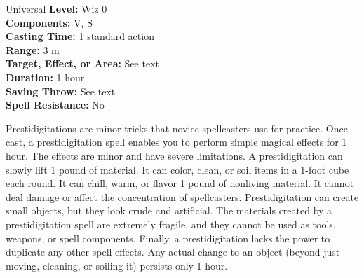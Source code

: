 {Universal}
{
	\textbf{Level:}
	Wiz 0\\
	\textbf{Components:}
	V, S\\
	\textbf{Casting Time:}
	1 standard action\\
	\textbf{Range:}
	3 m\\
	\textbf{Target, Effect, or Area:}
	See text\\
	\textbf{Duration:}
	1 hour\\
	\textbf{Saving Throw:}
	See text\\
	\textbf{Spell Resistance:}
	No\\
}
{
	Prestidigitations are minor tricks that novice spellcasters use for practice. Once cast, a prestidigitation spell enables you to perform simple magical effects for 1 hour. The effects are minor and have severe limitations. A prestidigitation can slowly lift 1 pound of material. It can color, clean, or soil items in a 1-foot cube each round. It can chill, warm, or flavor 1 pound of nonliving material. It cannot deal damage or affect the concentration of spellcasters. Prestidigitation can create small objects, but they look crude and artificial. The materials created by a prestidigitation spell are extremely fragile, and they cannot be used as tools, weapons, or spell components. Finally, a prestidigitation lacks the power to duplicate any other spell effects. Any actual change to an object (beyond just moving, cleaning, or soiling it) persists only 1 hour.

}
